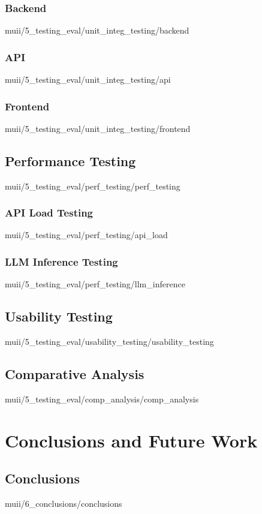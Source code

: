 \documentclass[english,epsbased,copyright,final,printable,covers,extendedindex,firstnumbered,tfm,gnuplot,loc,loe,lof,lot]{tfgtfmthesisuam}
\begin{document}
      \subsection{Backend\label{SS:BACKUNITTEST}}{muii/5_testing_eval/unit_integ_testing/backend}
      \subsection{API\label{SS:APIINTEGTEST}}{muii/5_testing_eval/unit_integ_testing/api}
      \subsection{Frontend\label{SS:FRONTTEST}}{muii/5_testing_eval/unit_integ_testing/frontend}

    \section{Performance Testing\label{SEC:PERFORMANCETEST}}{muii/5_testing_eval/perf_testing/perf_testing}
      \subsection{API Load Testing\label{SS:APILAT}}{muii/5_testing_eval/perf_testing/api_load}
      \subsection{LLM Inference Testing\label{SS:LLMLAT}}{muii/5_testing_eval/perf_testing/llm_inference}
    
    \section{Usability Testing\label{SEC:USABILITYTEST}}{muii/5_testing_eval/usability_testing/usability_testing}
    
    \section{Comparative Analysis\label{SEC:COMPANALYSIS}}{muii/5_testing_eval/comp_analysis/comp_analysis}

  \chapter{Conclusions and Future Work\label{CAP:CONCLUSIONS}}
    \section{Conclusions\label{SEC:CONCLUSIONS}}{muii/6_conclusions/conclusions}
\end{document}
